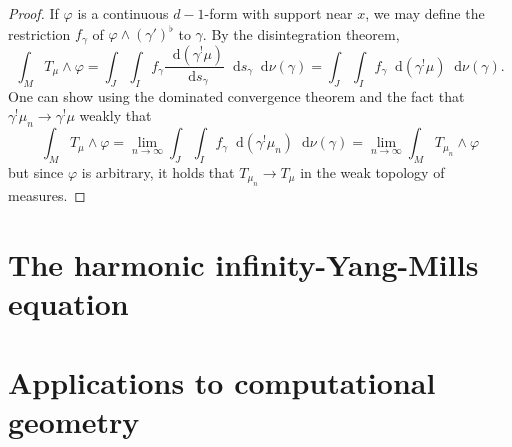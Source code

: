 \documentclass[final,12pt, leqno]{brownthesis}
\newcommand*\dif{\mathop{}\!\mathrm{d}}
\theoremstyle{definition}
\numberwithin{equation}{section}
\begin{document}
\begin{proof}
	If $\varphi$ is a continuous $d-1$-form with support near $x$, we may define the restriction $f_\gamma$ of $\varphi \wedge (\gamma')^\flat$ to $\gamma$.
	By the disintegration theorem,
	$$\int_M T_\mu \wedge \varphi = \int_J \int_I f_\gamma \frac{\dif(\gamma^! \mu)}{\dif s_\gamma} \dif s_\gamma \dif \nu(\gamma) = \int_J \int_I f_\gamma \dif(\gamma^! \mu) \dif \nu(\gamma).$$
	One can show using the dominated convergence theorem and the fact that $\gamma^! \mu_n \to \gamma^! \mu$ weakly that 
	$$\int_M T_\mu \wedge \varphi = \lim_{n \to \infty} \int_J \int_I f_\gamma \dif(\gamma^! \mu_n) \dif \nu(\gamma) = \lim_{n \to \infty} \int_M T_{\mu_n} \wedge \varphi$$
	but since $\varphi$ is arbitrary, it holds that $T_{\mu_n} \to T_\mu$ in the weak topology of measures.
\end{proof}

\chapter{The harmonic infinity-Yang-Mills equation}

\chapter{Applications to computational geometry}

\printbibliography
\end{document}
